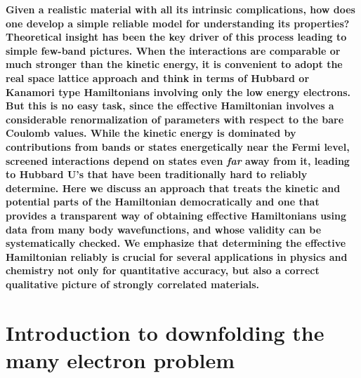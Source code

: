 \documentclass[prl,12pt,onecolumn,nofootinbib,notitlepage,english,superscriptaddress]{revtex4-1}
\newcommand{\HJC}[1]{{\color{RED}{\bf HJC: #1}}}
\begin{document}
\textbf{
Given a realistic material with all its intrinsic complications, how does one develop a 
simple reliable model for understanding its properties? Theoretical insight has been the key driver of 
this process leading to simple few-band pictures. When the interactions are comparable or much stronger than 
the kinetic energy, it is convenient to adopt the real space lattice approach and think in terms of Hubbard or Kanamori type 
Hamiltonians involving only the low energy electrons. 
But this is no easy task, since the effective Hamiltonian involves a considerable renormalization of parameters with respect 
to the bare Coulomb values. While the kinetic energy is dominated by contributions from bands or states energetically 
near the Fermi level, screened interactions depend on states even \emph{far} away from it, leading to Hubbard U's 
that have been traditionally hard to reliably determine. 
Here we discuss an approach that treats 
the kinetic and potential parts of the Hamiltonian democratically and one that provides a transparent way 
of obtaining effective Hamiltonians using data from many body wavefunctions, 
and whose validity can be systematically checked.
We emphasize that determining the effective Hamiltonian reliably is crucial for 
several applications in physics and chemistry not only for quantitative accuracy, but also a 
correct qualitative picture of strongly correlated materials. 
}

\section{Introduction to downfolding the many electron problem}

\HJC{Survey of DFT based downfolding and known limitations....Survey of model Hamiltonians - Hubbard, Kanamori, .....}
\HJC{Modify intro - this is from the paper........ }
\end{document}
